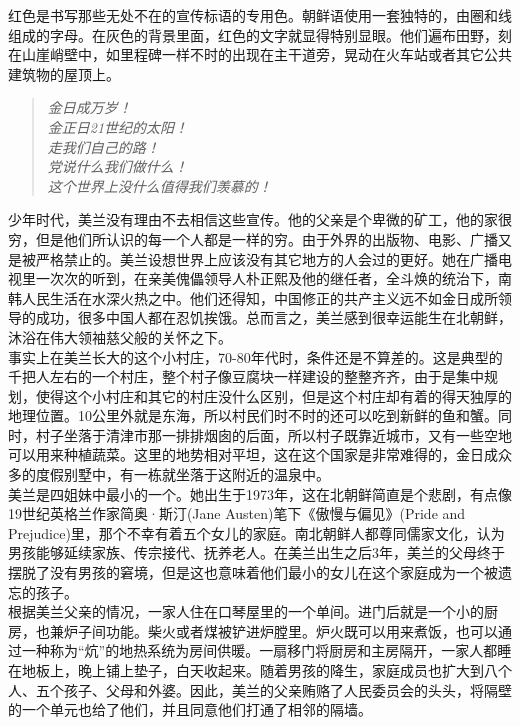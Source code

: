 红色是书写那些无处不在的宣传标语的专用色。朝鲜语使用一套独特的，由圈和线组成的字母。在灰色的背景里面，红色的文字就显得特别显眼。他们遍布田野，刻在山崖峭壁中，如里程碑一样不时的出现在主干道旁，晃动在火车站或者其它公共建筑物的屋顶上。\\

\begin{quote}
	\begin{spacing}{1.0}  %
		\textit{{\footnotesize 	金日成万岁！\\
		金正日21世纪的太阳！\\
		走我们自己的路！\\
		党说什么我们做什么！\\
		这个世界上没什么值得我们羡慕的！\\}}
	\end{spacing}
\end{quote}

少年时代，美兰没有理由不去相信这些宣传。他的父亲是个卑微的矿工，他的家很穷，但是他们所认识的每一个人都是一样的穷。由于外界的出版物、电影、广播又是被严格禁止的。美兰设想世界上应该没有其它地方的人会过的更好。她在广播电视里一次次的听到，在亲美傀儡领导人朴正熙及他的继任者，全斗焕的统治下，南韩人民生活在水深火热之中。他们还得知，中国修正的共产主义远不如金日成所领导的成功，很多中国人都在忍饥挨饿。总而言之，美兰感到很幸运能生在北朝鲜，沐浴在伟大领袖慈父般的关怀之下。\\

事实上在美兰长大的这个小村庄，70-80年代时，条件还是不算差的。这是典型的千把人左右的一个村庄，整个村子像豆腐块一样建设的整整齐齐，由于是集中规划，使得这个小村庄和其它的村庄没什么区别，但是这个村庄却有着的得天独厚的地理位置。10公里外就是东海，所以村民们时不时的还可以吃到新鲜的鱼和蟹。同时，村子坐落于清津市那一排排烟囱的后面，所以村子既靠近城市，又有一些空地可以用来种植蔬菜。这里的地势相对平坦，这在这个国家是非常难得的，金日成众多的度假别墅中，有一栋就坐落于这附近的温泉中。\\

美兰是四姐妹中最小的一个。她出生于1973年，这在北朝鲜简直是个悲剧，有点像19世纪英格兰作家简奥·斯汀(Jane Austen)笔下《傲慢与偏见》(Pride and Prejudice)里，那个不幸有着五个女儿的家庭。南北朝鲜人都尊同儒家文化，认为男孩能够延续家族、传宗接代、抚养老人。在美兰出生之后3年，美兰的父母终于摆脱了没有男孩的窘境，但是这也意味着他们最小的女儿在这个家庭成为一个被遗忘的孩子。\\

根据美兰父亲的情况，一家人住在口琴屋里的一个单间。进门后就是一个小的厨房，也兼炉子间功能。柴火或者煤被铲进炉膛里。炉火既可以用来煮饭，也可以通过一种称为“炕”的地热系统为房间供暖。一扇移门将厨房和主房隔开，一家人都睡在地板上，晚上铺上垫子，白天收起来。随着男孩的降生，家庭成员也扩大到八个人、五个孩子、父母和外婆。因此，美兰的父亲贿赂了人民委员会的头头，将隔壁的一个单元也给了他们，并且同意他们打通了相邻的隔墙。\\


